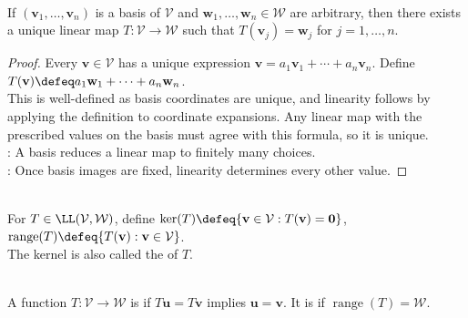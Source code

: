 \begin{proposition} \label{prop:linear-map-determined-by-basis} \\
If $(\mathbf{v}_1, \ldots, \mathbf{v}_n)$ is a basis of $\mathcal{V}$ and $\mathbf{w}_1, \ldots, \mathbf{w}_n \in \mathcal{W}$ are arbitrary, then there exists a unique linear map $T : \mathcal{V} \to \mathcal{W}$ such that $T(\mathbf{v}_j) = \mathbf{w}_j$ for $j=1,\ldots,n$.
\begin{proof}
Every $\mathbf{v} \in \mathcal{V}$ has a unique expression $\mathbf{v} = a_1\mathbf{v}_1 + \cdots + a_n\mathbf{v}_n$. Define $T(\mathbf{v}) \defeq a_1\mathbf{w}_1 + \cdots + a_n\mathbf{w}_n$.\\
This is well-defined as basis coordinates are unique, and linearity follows by applying the definition to coordinate expansions. Any linear map with the prescribed values on the basis must agree with this formula, so it is unique.\\
: A basis reduces a linear map to finitely many choices.\\
: Once basis images are fixed, linearity determines every other value.
\end{proof}
\end{proposition}

\begin{definition} \\
For $T \in \LL(\mathcal{V}, \mathcal{W})$, define $\ker(T) \defeq \{ \mathbf{v} \in \mathcal{V} : T(\mathbf{v}) = \mathbf{0} \}$, $\operatorname{range}(T) \defeq \{ T(\mathbf{v}) : \mathbf{v} \in \mathcal{V} \}$.\\
The kernel is also called the  of $T$.
\end{definition}

\begin{definition} \\
A function $T:\mathcal{V}\to\mathcal{W}$ is  if $T\mathbf{u}=T\mathbf{v}$ implies $\mathbf{u}=\mathbf{v}$. It is  if $\operatorname{range}(T)=\mathcal{W}$.
\end{definition}

